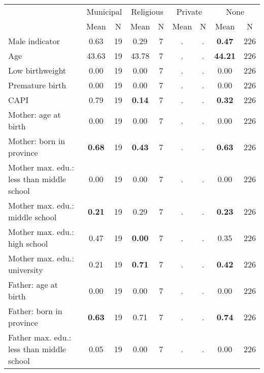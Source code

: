 \begin{tabular}{l c c c c c c c c}
\toprule
& \multicolumn{2}{c}{Municipal} & \multicolumn{2}{c}{Religious} & \multicolumn{2}{c}{Private} & \multicolumn{2}{c}{None} \\
& \scriptsize Mean & \scriptsize N & \scriptsize Mean & \scriptsize N & \scriptsize Mean & \scriptsize N & \scriptsize Mean & \scriptsize N \\
\midrule
Male indicator &      0.63 &        19 &      0.29 &         7 &         . & . & \textbf{     0.47} &       226 \\
Age &     43.63 &        19 &     43.78 &         7 &         . & . & \textbf{    44.21} &       226 \\
Low birthweight &      0.00 &        19 &      0.00 &         7 &         . & . &      0.00 &       226 \\
Premature birth &      0.00 &        19 &      0.00 &         7 &         . & . &      0.00 &       226 \\
CAPI &      0.79 &        19 & \textbf{     0.14} &         7 &         . & . & \textbf{     0.32} &       226 \\
Mother: age at birth &      0.00 &        19 &      0.00 &         7 &         . & . &      0.00 &       226 \\
Mother: born in province & \textbf{     0.68} &        19 & \textbf{     0.43} &         7 &         . & . & \textbf{     0.63} &       226 \\
Mother max. edu.: less than middle school &      0.00 &        19 &      0.00 &         7 &         . & . &      0.00 &       226 \\
Mother max. edu.: middle school & \textbf{     0.21} &        19 &      0.29 &         7 &         . & . & \textbf{     0.23} &       226 \\
Mother max. edu.: high school &      0.47 &        19 & \textbf{     0.00} &         7 &         . & . &      0.35 &       226 \\
Mother max. edu.: university &      0.21 &        19 & \textbf{     0.71} &         7 &         . & . & \textbf{     0.42} &       226 \\
Father: age at birth &      0.00 &        19 &      0.00 &         7 &         . & . &      0.00 &       226 \\
Father: born in province & \textbf{     0.63} &        19 &      0.71 &         7 &         . & . & \textbf{     0.74} &       226 \\
Father max. edu.: less than middle school &      0.05 &        19 &      0.00 &         7 &         . & . &      0.00 &       226 \\

\end{tabular}
